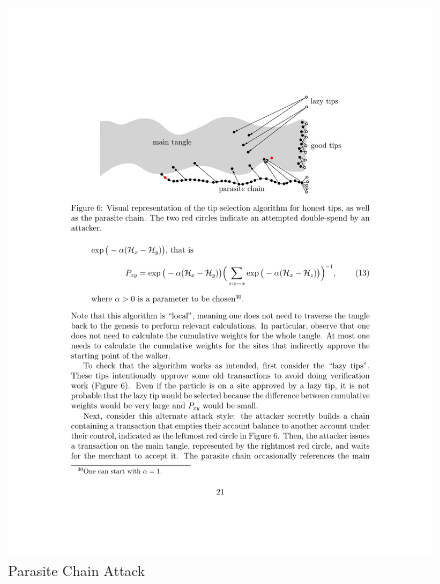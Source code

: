 \begin{figure}[H]
    \centering
    \includegraphics[width=12cm]{images/parasite-chain.pdf}
    \caption{Parasite Chain Attack \cite{the-tangle}}
    \label{fig:parasite-chain}
\end{figure}




